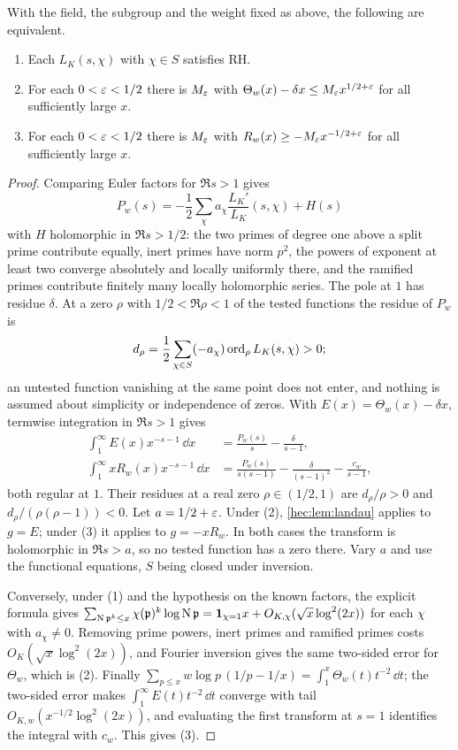 \begin{theorem}\label{hec:thm:classweight}
With the field, the subgroup and the weight fixed as above, the following are equivalent.
\begin{enumerate}[label=\textup{(\arabic*)}]
\item Each $L_K(s,\chi)$ with $\chi\in S$ satisfies RH.
\item For each $0<\varepsilon<1/2$ there is $M_\varepsilon$ with $\Theta_w(x)-\delta x\le M_\varepsilon x^{1/2+\varepsilon}$ for all
sufficiently large $x$.
\item For each $0<\varepsilon<1/2$ there is $M_\varepsilon$ with $R_w(x)\ge-M_\varepsilon x^{-1/2+\varepsilon}$ for all sufficiently
large $x$.
\end{enumerate}
\end{theorem}

\begin{proof}
Comparing Euler factors for $\Re s>1$ gives
\[
 P_w(s)=-\frac12\sum_\chi a_\chi\frac{L_K'}{L_K}(s,\chi)+H(s)
\]
with $H$ holomorphic in $\Re s>1/2$: the two primes of degree one above a split prime contribute equally,
inert primes have norm $p^2$, the powers of exponent at least two converge absolutely and locally
uniformly there, and the ramified primes contribute finitely many locally holomorphic series. The pole at
$1$ has residue $\delta$. At a zero $\rho$ with $1/2<\Re\rho<1$ of the tested functions the residue of
$P_w$ is
\[
 d_\rho=\frac12\sum_{\chi\in S}(-a_\chi)\operatorname{ord}_\rho L_K(s,\chi)>0 ;
\]
an untested function vanishing at the same point does not enter, and nothing is assumed about simplicity
or independence of zeros. With $E(x)=\Theta_w(x)-\delta x$, termwise integration in $\Re s>1$ gives
\begin{align*}
 \int_1^\infty E(x)x^{-s-1}\,\dd x&=\frac{P_w(s)}s-\frac\delta{s-1},\\
 \int_1^\infty xR_w(x)x^{-s-1}\,\dd x&=\frac{P_w(s)}{s(s-1)}-\frac\delta{(s-1)^2}-\frac{c_w}{s-1},
\end{align*}
both regular at $1$. Their residues at a real zero $\rho\in(1/2,1)$ are $d_\rho/\rho>0$ and
$d_\rho/(\rho(\rho-1))<0$. Let $a=1/2+\varepsilon$. Under (2), \cref{hec:lem:landau} applies to $g=E$; under (3)
it applies to $g=-xR_w$. In both cases the transform is holomorphic in $\Re s>a$, so no tested function
has a zero there. Vary $a$ and use the functional equations, $S$ being closed under inversion.

Conversely, under (1) and the hypothesis on the known factors, the explicit formula gives
$\sum_{\operatorname{N}\mathfrak p^k\le x}\chi(\mathfrak p)^k\log\operatorname{N}\mathfrak p
=\mathbf{1}_{\chi=1}x+O_{K,\chi}(\sqrt x\log^2(2x))$ for each $\chi$ with $a_\chi\ne0$. Removing prime powers,
inert primes and ramified primes costs $O_K(\sqrt x\log^2(2x))$, and Fourier inversion gives the same
two-sided error for $\Theta_w$, which is (2). Finally $\sum_{p\le x}w\log p\,(1/p-1/x)
=\int_1^x\Theta_w(t)t^{-2}\,\dd t$; the two-sided error makes $\int_1^\infty E(t)t^{-2}\,\dd t$ converge with
tail $O_{K,w}(x^{-1/2}\log^2(2x))$, and evaluating the first transform at $s=1$ identifies the integral
with $c_w$. This gives (3).
\end{proof}

